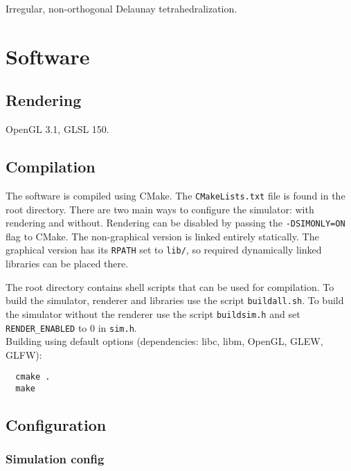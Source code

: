 \documentclass[12pt]{article}
\begin{document}
Irregular, non-orthogonal Delaunay tetrahedralization.

\section{Software}

\subsection{Rendering}

OpenGL 3.1, GLSL 150.

\subsection{Compilation}

The software is compiled using CMake. The \verb|CMakeLists.txt| file is found in the root directory. There are two main ways to configure the simulator: with rendering and without. Rendering can be disabled by passing the \verb|-DSIMONLY=ON| flag to CMake. The non-graphical version is linked entirely statically. The graphical version has its \verb|RPATH| set to \verb|lib/|, so required dynamically linked libraries can be placed there.

The root directory contains shell scripts that can be used for compilation. To build the simulator, renderer and libraries use the script \verb|buildall.sh|. To build the simulator without the renderer use the script \verb|buildsim.h| and set \verb|RENDER_ENABLED| to 0 in \verb|sim.h|.\\
Building using default options (dependencies: libc, libm, OpenGL, GLEW, GLFW):
\begin{verbatim}
  cmake .
  make
\end{verbatim}

\subsection{Configuration}

\subsubsection{Simulation config}
\end{document}
